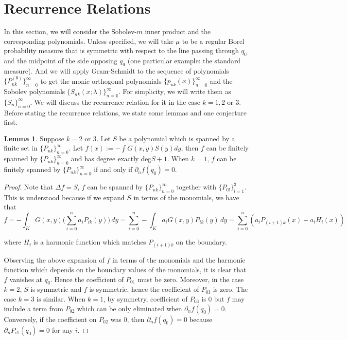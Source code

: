 \documentclass[12pt]{amsart}
\theoremstyle{plain}
\theoremstyle{definition}
\newtheorem{lemma}{Lemma}[section]
\newcommand{\lap}{\Delta}
\begin{document}
\section{Recurrence Relations}
In this section, we will consider the Sobolev-$m$ inner product and the corresponding polynomials. Unless specified, we will take $\mu$ to be a regular Borel probability measure that is symmetric with respect to the line passing through $q_0$ and the midpoint of the side opposing $q_0$ (one particular example: the standard measure). And we will apply Gram-Schmidt to the sequence of polynomials $\{P_{nk}^{(0)}\}_{n=0}^{\infty}$ to get the monic orthogonal polynomials $\{p_{nk}(x)\}_{n=0}^{\infty}$ and the Sobolev polynomials $\{S_{nk}(x;
\lambda)\}_{n=0}^{\infty}$. For simplicity, we will write them as $\{S_{n}\}_{n=0}^{\infty}$. We will discuss the recurrence relation for it in the case $k=1,2$ or $3$. Before stating the recurrence relations, we state some lemmas and one conjecture first.
\begin{lemma}\label{Lemma: Family 2 and 3 is self contained on Green's; Family 1 isn't}
Suppose $k=2$ or $3$. Let $S$ be a polynomial which is spanned by a finite set in $\{P_{nk}\}_{n=0}^{\infty}$. Let $f(x):= -\int G(x,y)S(y)dy$, then $f$ can be finitely spanned by $\{P_{nk}\}_{n=0}^{\infty}$ and has degree exactly deg$S+1$. When $k=1$, $f$ can be finitely spanned by $\{P_{nk}\}_{n=0}^{\infty}$ if and only if $\partial_n f(q_0)=0$.
\end{lemma}
\begin{proof}
Note that $\lap f=S$, $f$ can be spanned by $\{P_{nk}\}_{n=0}^{\infty}$ together with $\{P_{0l}\}_{l=1}^3$. This is understood because if we expand $S$ in terms of the monomials, we have that 
$$ f = -\int_{K} G(x,y)\Big(\sum_{i=0}^{n}a_iP_{ik}(y)\Big)\,dy = \sum_{i=0}^{n}-\int_{K} a_iG(x,y)P_{ik}(y)\,dy = \sum_{i=0}^{n}\left(a_iP_{(i+1)k}(x) - a_iH_{i}(x)\right)$$

where $H_{i}$ is a harmonic function which matches $P_{(i+1)k}$ on the boundary. 

Observing the above expansion of $f$ in terms of the monomials and the harmonic function which depends on the boundary values of the monomials, it is clear that $f$ vanishes at $q_0$. Hence the coefficient of $P_{01}$ must be zero. Moreover, in the case $k=2$, $S$ is symmetric and $f$ is symmetric, hence the coefficient of $P_{03}$ is zero. The case $k=3$ is similar.
When $k=1$, by symmetry, coefficient of $P_{03}$ is $0$ but $f$ may include a term from $P_{02}$ which can be only eliminated when $\partial_n f(q_0) = 0$. Conversely, if the coefficient on $P_{02}$ was 0, then $\partial_n f(q_0) = 0$ because $\partial_n P_{i1}(q_0)=0$ for any $i$. \end{proof}
\end{document}
